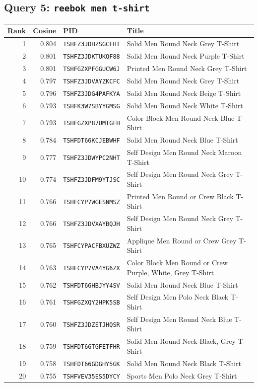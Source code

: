 \subsection*{Query 5: \texttt{reebok men t-shirt}}
\begin{longtable}{r r l p{}}
\toprule
Rank & Cosine & PID & Title \\
\midrule
\endhead
1 & 0.804 & \texttt{TSHFZ3JDHZSGCFHT} & Solid Men Round Neck Grey T-Shirt \\
2 & 0.801 & \texttt{TSHFZ3JDKTUKQF88} & Solid Men Round Neck Purple T-Shirt \\
3 & 0.801 & \texttt{TSHFGZXPFGGUCW6J} & Printed Men Round Neck Grey T-Shirt \\
4 & 0.797 & \texttt{TSHFZ3JDVAYZKCFC} & Solid Men Round Neck Grey T-Shirt \\
5 & 0.796 & \texttt{TSHFZ3JDG4PAFKYA} & Solid Men Round Neck Beige T-Shirt \\
6 & 0.793 & \texttt{TSHFK3W7SBYYGMSG} & Solid Men Round Neck White T-Shirt \\
7 & 0.793 & \texttt{TSHFGZXP87UMTGFH} & Color Block Men Round Neck Blue T-Shirt \\
8 & 0.784 & \texttt{TSHFDT66KCJEBWHF} & Solid Men Round Neck Blue T-Shirt \\
9 & 0.777 & \texttt{TSHFZ3JDWYPC2NHT} & Self Design Men Round Neck Maroon T-Shirt \\
10 & 0.774 & \texttt{TSHFZ3JDFM9YTJSC} & Self Design Men Round Neck Grey T-Shirt \\
11 & 0.766 & \texttt{TSHFCYP7WGESNMSZ} & Printed Men Round or Crew Black T-Shirt \\
12 & 0.766 & \texttt{TSHFZ3JDVXAYBQJH} & Self Design Men Round Neck Grey T-Shirt \\
13 & 0.765 & \texttt{TSHFCYPACFBXUZWZ} & Applique Men Round or Crew Grey T-Shirt \\
14 & 0.763 & \texttt{TSHFCYP7VA4YG6ZX} & Color Block Men Round or Crew Purple, White, Grey T-Shirt \\
15 & 0.762 & \texttt{TSHFDT66HBJYY4SV} & Solid Men Round Neck Blue T-Shirt \\
16 & 0.761 & \texttt{TSHFGZXQY2HPK5SB} & Self Design Men Polo Neck Black T-Shirt \\
17 & 0.760 & \texttt{TSHFZ3JDZETJHQSR} & Self Design Men Round Neck Blue T-Shirt \\
18 & 0.759 & \texttt{TSHFDT66TGFETFHR} & Solid Men Round Neck Black, Grey T-Shirt \\
19 & 0.758 & \texttt{TSHFDT66GDGHY5GK} & Solid Men Round Neck Black T-Shirt \\
20 & 0.755 & \texttt{TSHFVEV35ES5DYCY} & Sports Men Polo Neck Grey T-Shirt \\
\end{longtable}
